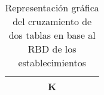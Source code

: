 \begin{table}[H]
\begin{tabular}{ccllcccll}
\multicolumn{1}{|c|}{\cellcolor[HTML]{FFFFC7}} & \multicolumn{1}{c|}{\cellcolor[HTML]{FFFFC7}} & \multicolumn{1}{l|}{\cellcolor[HTML]{FFFFC7}} & \multicolumn{1}{l|}{\cellcolor[HTML]{FFFFC7}} & \multicolumn{1}{c|}{\cellcolor[HTML]{FFCC67}K} & \multicolumn{1}{c|}{\cellcolor[HTML]{CBCEFB}} & \multicolumn{1}{c|}{\cellcolor[HTML]{CBCEFB}} & \multicolumn{1}{l|}{\cellcolor[HTML]{CBCEFB}} & \multicolumn{1}{l|}{\cellcolor[HTML]{CBCEFB}} \\ \hline
\end{tabular}
\caption{Representación gráfica del cruzamiento de dos tablas en base al RBD de los establecimientos}
\label{tab:cruce-rbd}
\end{table}